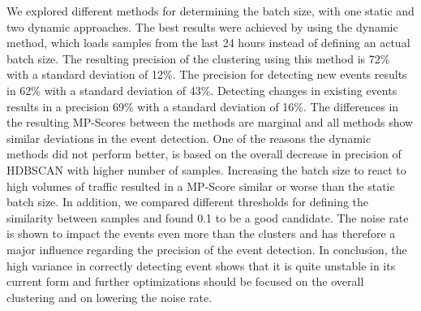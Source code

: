 We explored different methods for determining the batch size, with one static and two dynamic approaches.
The best results were achieved by using the dynamic method,
which loads samples from the last 24 hours instead of defining an actual batch size.
The resulting precision of the clustering using this method is 72\% with a standard deviation of 12\%.
The precision for detecting new events results in 62\% with a standard deviation of 43\%.
Detecting changes in existing events results in a precision 69\% with a standard deviation of 16\%.
The differences in the resulting MP-Scores between the methods are marginal
and all methods show similar deviations in the event detection.
One of the reasons the dynamic methods did not perform better,
is based on the overall decrease in precision of HDBSCAN with higher number of samples.
Increasing the batch size to react to high volumes of traffic
resulted in a MP-Score similar or worse than the static batch size.
In addition, we compared different thresholds for defining the similarity between samples
and found 0.1 to be a good candidate.
The noise rate is shown to impact the events even more than the clusters
and has therefore a major influence regarding the precision of the event detection.
In conclusion, the high variance in correctly detecting event shows
that it is quite unstable in its current form and further optimizations should be focused
on the overall clustering and on lowering the noise rate.
